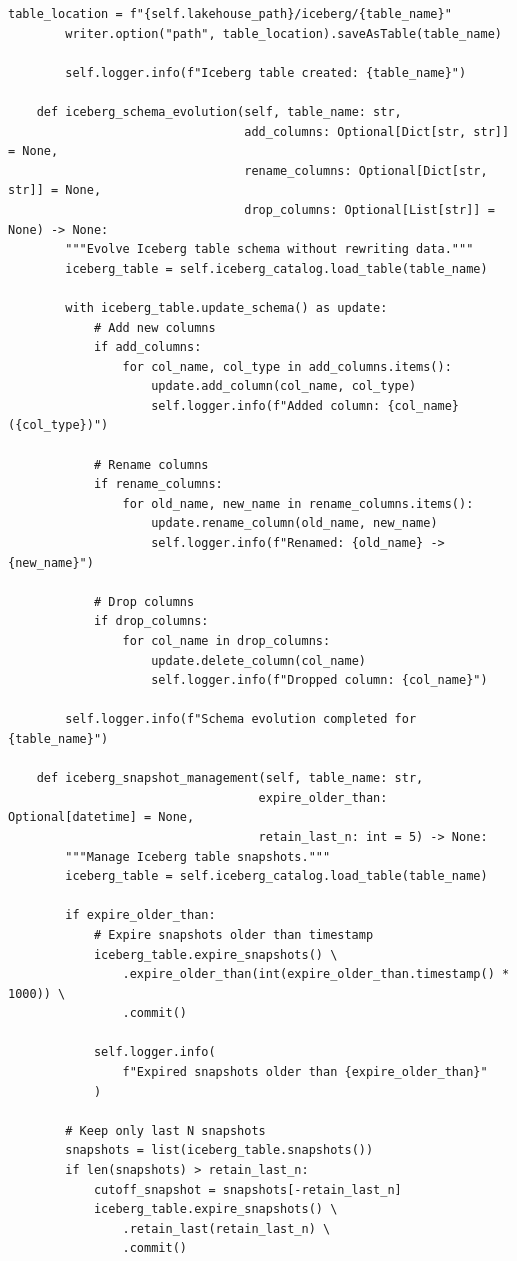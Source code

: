 \begin{lstlisting}[style=python, caption=LakehouseIntegrator with Modern Table Formats]
        table_location = f"{self.lakehouse_path}/iceberg/{table_name}"
        writer.option("path", table_location).saveAsTable(table_name)

        self.logger.info(f"Iceberg table created: {table_name}")

    def iceberg_schema_evolution(self, table_name: str,
                                 add_columns: Optional[Dict[str, str]] = None,
                                 rename_columns: Optional[Dict[str, str]] = None,
                                 drop_columns: Optional[List[str]] = None) -> None:
        """Evolve Iceberg table schema without rewriting data."""
        iceberg_table = self.iceberg_catalog.load_table(table_name)

        with iceberg_table.update_schema() as update:
            # Add new columns
            if add_columns:
                for col_name, col_type in add_columns.items():
                    update.add_column(col_name, col_type)
                    self.logger.info(f"Added column: {col_name} ({col_type})")

            # Rename columns
            if rename_columns:
                for old_name, new_name in rename_columns.items():
                    update.rename_column(old_name, new_name)
                    self.logger.info(f"Renamed: {old_name} -> {new_name}")

            # Drop columns
            if drop_columns:
                for col_name in drop_columns:
                    update.delete_column(col_name)
                    self.logger.info(f"Dropped column: {col_name}")

        self.logger.info(f"Schema evolution completed for {table_name}")

    def iceberg_snapshot_management(self, table_name: str,
                                   expire_older_than: Optional[datetime] = None,
                                   retain_last_n: int = 5) -> None:
        """Manage Iceberg table snapshots."""
        iceberg_table = self.iceberg_catalog.load_table(table_name)

        if expire_older_than:
            # Expire snapshots older than timestamp
            iceberg_table.expire_snapshots() \
                .expire_older_than(int(expire_older_than.timestamp() * 1000)) \
                .commit()

            self.logger.info(
                f"Expired snapshots older than {expire_older_than}"
            )

        # Keep only last N snapshots
        snapshots = list(iceberg_table.snapshots())
        if len(snapshots) > retain_last_n:
            cutoff_snapshot = snapshots[-retain_last_n]
            iceberg_table.expire_snapshots() \
                .retain_last(retain_last_n) \
                .commit()


\end{lstlisting}
